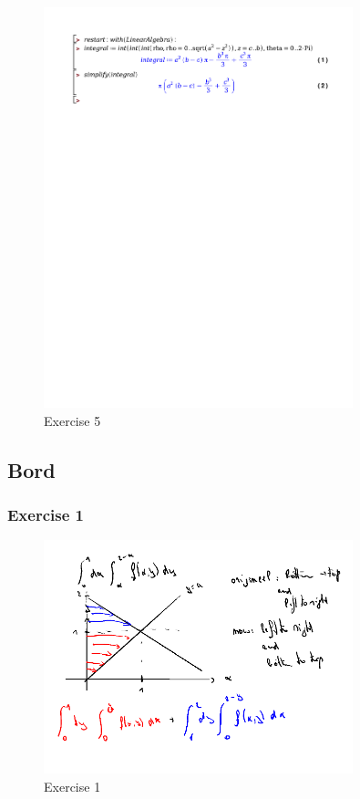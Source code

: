 \documentclass[a4paper]{report}
\begin{document}
\begin{figure}[H]
	\centering
	\includegraphics[width=0.8\textwidth]{exercises/huis_5_ex_5.pdf}
	\caption{Exercise 5}
	\label{fig:huis_5_ex_5_maple}
\end{figure}

\subsection{Bord}

\subsubsection{Exercise 1}

\begin{figure}[H]
	\centering
	\includegraphics[width=0.8\textwidth]{assets/bord_5_ex_1.png}
	\caption{Exercise 1}
	\label{fig:bord_5_ex_1}
\end{figure}
\end{document}

